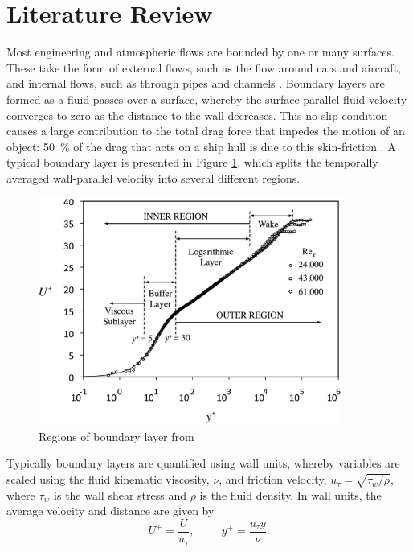 \documentclass[12pt,oneside,a4paper]{article}
\begin{document}
\section{Literature Review}
\label{section:literatureReview}
Most engineering and atmospheric flows are bounded by one or many surfaces. These take the form of external flows, such as the flow around cars and aircraft, and internal flows, such as through pipes and channels \citep{pope2001}. Boundary layers are formed as a fluid passes over a surface, whereby the surface-parallel fluid velocity converges to zero as the distance to the wall decreases. This no-slip condition causes a large contribution to the total drag force that impedes the motion of an object: \SI{50}{\%} of the drag that acts on a ship hull is due to this skin-friction \citep{perlin2016}. A typical boundary layer is presented in Figure \ref{figure:literatureReview:boundaryLayerRegions}, which splits the temporally averaged wall-parallel velocity into several different regions.
%
\begin{figure}[!b]
\centering
\includegraphics[width=10cm]{images/litReview/boundaryLayerRegions.png}
\caption{Regions of boundary layer from \cite{perlin2016} }
\label{figure:literatureReview:boundaryLayerRegions}
\end{figure}
%
Typically boundary layers are quantified using wall units, whereby variables are scaled using the fluid kinematic viscosity, $\nu$, and friction velocity, $u_\tau = \sqrt{\tau_w / \rho}$, where $\tau_w$ is the wall shear stress and $\rho$ is the fluid density. In wall units, the average velocity and distance are given by
\begin{equation}
U^+ = \frac{U}{u_\tau}, \hspace{1cm} y^+ = \frac{u_\tau y }{\nu}.
\end{equation}
\end{document}
